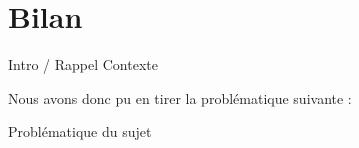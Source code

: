 \chapter{Bilan}

Intro / Rappel Contexte

Nous avons donc pu en tirer la problématique suivante :

\begin{center}
\hskip7mm
Problématique du sujet
\end{center}





\newpage

